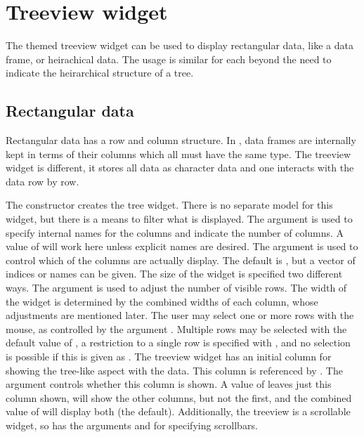 \section{Treeview widget}
\label{sec:tcltk:treeview-widget}

The themed treeview widget can be used to display rectangular data,
like a data frame, or heirachical data. The usage is similar for each beyond the need to indicate the heirarchical structure of a tree.

\subsection{Rectangular data}


Rectangular data has a row and column structure. In \R, data frames are internally kept in terms of their columns which all must have the same type. The treeview widget is different, it stores all data as character data and one interacts with the data row by row. 

The  constructor creates the tree
widget. There is no separate model for this widget, but there is a
means to filter what is displayed.  The argument
 is used to specify internal names for
the columns and indicate the number of columns. A value of 
will work here unless explicit names are desired. The argument
 is used to control which of the
columns are actually display. The default is , but a vector
of indices or names can be given.  The size of the widget is specified
two different ways.  The  argument is
used to adjust the number of visible rows. The width of the widget is
determined by the combined widths of each column, whose adjustments
are mentioned later. The user may select one or more rows with the
mouse, as controlled by the argument
. Multiple rows may be selected with
the default value of , a restriction to a single row
is specified with , and no selection is possible if this
is given as .  The treeview widget has an initial column
for showing the tree-like aspect with the data. This column is
referenced by . The  argument
controls whether this column is shown. A value of  leaves
just this column shown,  will show the other columns,
but not the first, and the combined value of  will
display both (the default).  Additionally, the treeview is a
scrollable widget, so has the arguments
 and
 for specifying scrollbars.


